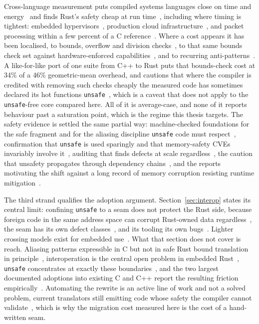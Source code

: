 \documentclass[english,twoside,openright,a4paper,censored,csm,software-track-2020]{HYthesisML}
\begin{document}
Cross-language measurement puts compiled systems languages close on time and
energy~\cite{bugden2022rust,pereira2017energy} and finds Rust's safety cheap at run
time~\cite{balasubramanian2017rust,levy2017kernel}, including where timing is tightest: embedded
hypervisors~\cite{mo2023rustshyper}, production cloud infrastructure~\cite{agache2020firecracker},
and packet processing within a few percent of a C
reference~\cite{emmerich2019drivers,xiao2024rpkt}. Where a cost appears it has been localised, to
bounds, overflow and division checks~\cite{zhang2022runtime}, to that same bounds check set
against hardware-enforced capabilities~\cite{harris2023morello}, and to recurring
anti-patterns~\cite{cui2025perfbugs}. A like-for-like port of one suite from C++ to Rust puts that
bounds-check cost at 34\% of a 46\% geometric-mean overhead, and cautions that where the compiler
is credited with removing such checks cheaply the measured code has sometimes declared its hot
functions \texttt{unsafe}~\cite{naylor2026cherisimt}, which is a caveat that does not apply to the
\texttt{unsafe}-free core compared here. All of it is average-case, and none of it reports behaviour
past a saturation point, which is the regime this thesis targets. The safety evidence is settled
the same partial way: machine-checked foundations for the safe fragment and for the
aliasing discipline \texttt{unsafe} code must
respect~\cite{jung2018rustbelt,jung2021safe,jung2020stacked}, confirmation that \texttt{unsafe} is
used sparingly and that memory-safety CVEs invariably involve
it~\cite{qin2020rust,astrauskas2020unsafe,xu2021rustcve}, auditing that finds
defects at scale regardless~\cite{bae2021rudra,zheng2024security,qin2024safety}, the caution that
unsafety propagates through dependency chains~\cite{evans2020rust}, and the reports motivating the
shift against a long record of memory corruption resisting runtime
mitigation~\cite{msrc2019memory,google2022android,google2024securebydesign,cisa2023memorysafe,oncd2024building,szekeres2013sok}.

The third strand qualifies the adoption argument. Section~\ref{sec:interop} states its central
limit: confining \texttt{unsafe} to a seam does not protect the Rust side, because foreign code in
the same address space can corrupt Rust-owned data
regardless~\cite{rivera2021galeed,kirth2022pkrusafe}, the seam has its own defect
classes~\cite{li2022crosslang}, and its tooling its own bugs~\cite{cai2026interop}. Lighter
crossing models exist for embedded use~\cite{schuermann2023encapsulated}. What that section does
not cover is reach. Aliasing patterns expressible in C but not in safe Rust bound translation in
principle~\cite{emre2023aliasing}, interoperation is the central open problem in embedded
Rust~\cite{sharma2024embedded}, \texttt{unsafe} concentrates at exactly these
boundaries~\cite{mccormack2026unsafe}, and the two largest documented adoptions into existing C
and C++ report the resulting friction empirically~\cite{li2026rustlinux,fan2026android}.
Automating the rewrite is an active line of work and not a solved problem, current translators
still emitting code whose safety the compiler cannot validate~\cite{hong2025ctorust}, which is why
the migration cost measured here is the cost of a hand-written seam.
\end{document}

